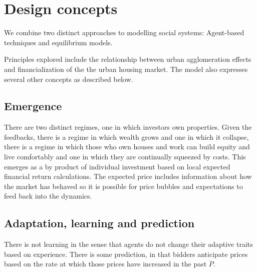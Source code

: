 \section{Design concepts}



We combine two distinct approaches to modelling social systems: Agent-based techniques and equilibrium models. 

Principles explored include the relationship between urban agglomeration effects and financialization of the the urban housing market. The model also expresses several other concepts as described below.

\subsection{Emergence}
There are two distinct regimes, one in which investors own properties. Given the feedbacks, there is a regime in which wealth grows and one in which it collapse, there is a regime in which those who own houses and work can build equity and live comfortably and one in which they are continually squeezed by costs. This emerges as a by product of individual investment based on local expected financial return calculations. 
The expected price includes information about how the market has behaved so it is possible for price bubbles and expectations to feed back into the dynamics. 

\subsection{Adaptation, learning and prediction}



There is not learning in the sense that agents do not change their adaptive traits based on experience. 
There is some prediction, in that bidders anticipate prices based on the rate at which those prices have increased in the past $\dot P$.

